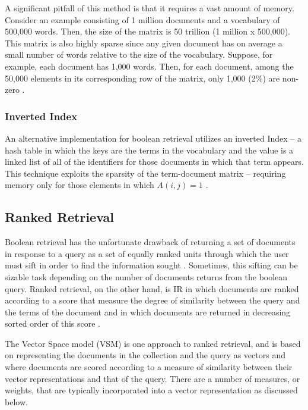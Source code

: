 A significant pitfall of this method is that it requires a vast amount of memory.  Consider an example consisting of 1 million documents and a vocabulary of 500,000 words.  Then, the size of the matrix is 50 trillion (1 million x 500,000).  This matrix is also highly sparse since any given document has on average a small number of words relative to the size of the vocabulary.  Suppose, for example, each document has 1,000 words.  Then, for each document, among the 50,000 elements in its corresponding row of the matrix, only 1,000 (2\%) are non-zero \cite{manning_2008_introduction_ch1}.	

\subsubsection{Inverted Index}

An alternative implementation for boolean retrieval utilizes an inverted Index -- a hash table in which the keys are the terms in the vocabulary and the value is a linked list of all of the identifiers for those documents in which that term appears.  This technique exploits the sparsity of the term-document matrix -- requiring memory only for those elements in which $A(i,j) = 1$ \cite{manning_2008_introduction_ch1}.


\subsection{Ranked Retrieval}

Boolean retrieval has the unfortunate drawback of returning a set of documents in response to a query as a set of equally ranked units through which the user must sift in order to find the information sought \cite{manning_2008_introduction_ch6}.  Sometimes, this sifting can be sizable task depending on the number of documents returns from the boolean query.  Ranked retrieval, on the other hand, is IR in which documents are ranked according to a score that measure the degree of similarity between the query and the terms of the document and in which documents are returned in decreasing sorted order of this score \cite{manning_2008_introduction_ch6}.  

The Vector Space model (VSM) \cite{manning_2008_introduction_ch6} is one approach to ranked retrieval, and is based on representing the documents in the collection and the query as vectors and where documents are scored according to a measure of similarity between their vector representations and that of the query.  There are a number of measures, or weights, that are typically incorporated into a vector representation as discussed below.

